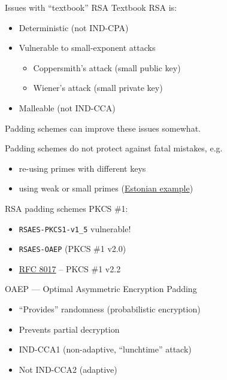 \begin{frame}{Issues with \enquote{textbook} RSA}
  Textbook RSA is:
  \begin{itemize}[<+(1)->]
    \item Deterministic (not IND-CPA)
    \item Vulnerable to small-exponent attacks
    \begin{itemize}
      \item Coppersmith's attack (small public key)
      \item Wiener's attack (small private key)
    \end{itemize}
    \item Malleable (not IND-CCA)
  \end{itemize}

  \pause
  Padding schemes can improve these issues somewhat.

  \pause
  Padding schemes do not protect against fatal mistakes, e.g.
  \begin{itemize}[<+(1)->]
    \item re-using primes with different keys
    \item using weak or small primes (\href{https://cybersec.ee/2017/10/18/rsa-2048-bit-keys-in-estonian-id-cards-issued-after-october-2014-are-factorizable/}{Estonian example})
  \end{itemize}
\end{frame}

\begin{frame}{RSA padding schemes}
  \pause
  PKCS \#1:
  \begin{itemize}[<+(1)->]
    \item \texttt{RSAES-PKCS1-v1\_5} vulnerable!
    \item \texttt{RSAES-OAEP} (PKCS \#1 v2.0)
    \item \href{https://datatracker.ietf.org/doc/html/rfc8017}{RFC 8017} -- PKCS \#1 v2.2
  \end{itemize}

  \pause
  OAEP --- Optimal Asymmetric Encryption Padding
  \begin{itemize}[<+(1)->]
    \item \enquote{Provides} randomness (probabilistic encryption)
    \item Prevents partial decryption
    \item IND-CCA1 (non-adaptive, \enquote{lunchtime} attack)
    \item Not IND-CCA2 (adaptive)
  \end{itemize}
\end{frame}

